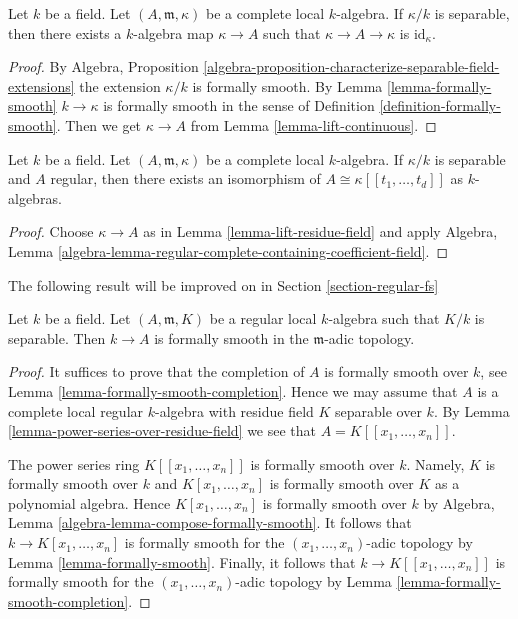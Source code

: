 \begin{lemma}
\label{lemma-lift-residue-field}
Let $k$ be a field. Let $(A, \mathfrak m, \kappa)$ be a complete
local $k$-algebra. If $\kappa/k$ is separable, then there exists
a $k$-algebra map $\kappa \to A$ such that $\kappa \to A \to \kappa$
is $\text{id}_\kappa$.
\end{lemma}

\begin{proof}
By Algebra, Proposition
\ref{algebra-proposition-characterize-separable-field-extensions}
the extension $\kappa/k$ is formally smooth. By
Lemma \ref{lemma-formally-smooth}
$k \to \kappa$ is formally smooth in the sense of
Definition \ref{definition-formally-smooth}.
Then we get $\kappa \to A$ from Lemma \ref{lemma-lift-continuous}.
\end{proof}

\begin{lemma}
\label{lemma-power-series-over-residue-field}
Let $k$ be a field. Let $(A, \mathfrak m, \kappa)$ be a complete
local $k$-algebra. If $\kappa/k$ is separable and $A$ regular, then
there exists an isomorphism of $A \cong \kappa[[t_1, \ldots, t_d]]$
as $k$-algebras.
\end{lemma}

\begin{proof}
Choose $\kappa \to A$ as in Lemma \ref{lemma-lift-residue-field}
and apply Algebra, Lemma
\ref{algebra-lemma-regular-complete-containing-coefficient-field}.
\end{proof}

\noindent
The following result will be improved on in
Section \ref{section-regular-fs}

\begin{lemma}
\label{lemma-regular-implies-fs}
Let $k$ be a field. Let $(A, \mathfrak m, K)$ be a regular local
$k$-algebra such that $K/k$ is separable. Then $k \to A$
is formally smooth in the $\mathfrak m$-adic topology.
\end{lemma}

\begin{proof}
It suffices to prove that the completion of $A$ is formally
smooth over $k$, see Lemma \ref{lemma-formally-smooth-completion}.
Hence we may assume that $A$ is a complete local regular $k$-algebra
with residue field $K$ separable over $k$.
By Lemma \ref{lemma-power-series-over-residue-field} we see that
$A = K[[x_1, \ldots, x_n]]$.

\medskip\noindent
The power series ring $K[[x_1, \ldots, x_n]]$ is formally
smooth over $k$. Namely, $K$ is formally smooth over $k$ and
$K[x_1, \ldots, x_n]$ is formally smooth over $K$ as a polynomial algebra.
Hence $K[x_1, \ldots, x_n]$ is formally smooth over $k$ by
Algebra, Lemma \ref{algebra-lemma-compose-formally-smooth}.
It follows that $k \to K[x_1, \ldots, x_n]$ is formally smooth
for the $(x_1, \ldots, x_n)$-adic topology by
Lemma \ref{lemma-formally-smooth}.
Finally, it follows that $k \to K[[x_1, \ldots, x_n]]$ is formally
smooth for the $(x_1, \ldots, x_n)$-adic topology by
Lemma \ref{lemma-formally-smooth-completion}.
\end{proof}

